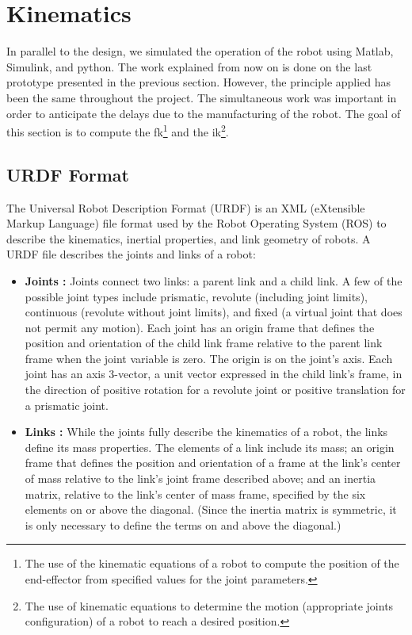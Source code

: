 \section{Kinematics}\insertloftspace
\setcounter{figure}{0}\setcounter{table}{0}

In parallel to the design, we simulated the operation of the robot using Matlab, Simulink, and python. The work explained from now on is done on the last prototype presented in the previous section. However, the principle applied has been the same throughout the project. The simultaneous work was important in order to anticipate the delays due to the manufacturing of the robot. The goal of this section is to compute the \Gls{fk}\footnote{The use of the kinematic equations of a robot to compute the position of the end-effector from specified values for the joint parameters.} and the \Gls{ik}\footnote{The use of kinematic equations to determine the motion (appropriate joints configuration) of a robot to reach a desired position.}.

\subsection{URDF Format}

The Universal Robot Description Format (URDF) is an XML (eXtensible Markup Language) file format used by the Robot Operating System (ROS) to describe the kinematics, inertial properties, and link geometry of robots. A URDF file describes the joints and links of a robot:

\begin{itemize}
    \item \textbf{Joints :} Joints connect two links: a parent link and a child link. A few of the possible joint types include prismatic, revolute (including joint limits), continuous (revolute without joint limits), and fixed (a virtual joint that does not permit any motion). Each joint has an origin frame that defines the position and orientation of the child link frame relative to the parent link frame when the joint variable is zero. The origin is on the joint's axis. Each joint has an axis 3-vector, a unit vector expressed in the child link's frame, in the direction of positive rotation for a revolute joint or positive translation for a prismatic joint.
    \item \textbf{Links :} While the joints fully describe the kinematics of a robot, the links define its mass properties. The elements of a link include its mass; an origin frame that defines the position and orientation of a frame at the link's center of mass relative to the link's joint frame described above; and an inertia matrix, relative to the link's center of mass frame, specified by the six elements on or above the diagonal. (Since the inertia matrix is symmetric, it is only necessary to define the terms on and above the diagonal.)
\end{itemize}

